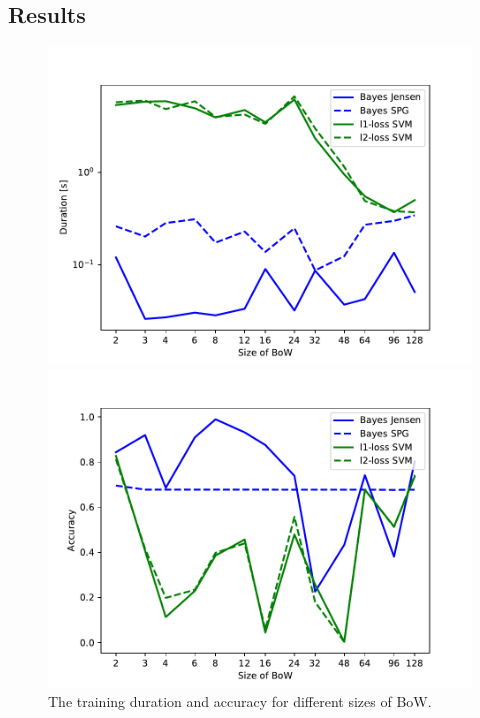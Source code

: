 \documentclass{aip-cp}
\begin{document}
\subsection{Results}
\begin{figure}[h!]
    \centering
    \begin{minipage}{.5\textwidth}
        \centering
        \includegraphics[width=\textwidth]{Figures/times.pdf}
    \end{minipage}%
    \begin{minipage}{.5\textwidth}
        \centering
        \includegraphics[width=\textwidth]{Figures/score.pdf}
    \end{minipage}
    \caption{The training duration and accuracy for different sizes of BoW.}
    \label{fig:results:graph}
\end{figure}
\end{document}
